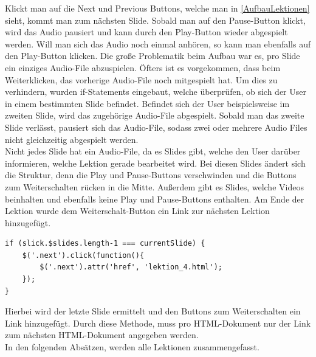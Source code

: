 Klickt man auf die Next und Previous Buttons, welche man in \ref{AufbauLektionen} sieht, kommt man zum nächsten Slide. Sobald man auf den Pause-Button klickt, wird das Audio pausiert und kann durch den Play-Button wieder abgespielt werden. Will man sich das Audio noch einmal anhören, so kann man ebenfalls auf den Play-Button klicken. Die große Problematik beim Aufbau war es, pro Slide ein einziges Audio-File abzuspielen. Öfters ist es vorgekommen, dass beim Weiterklicken, das vorherige Audio-File noch mitgespielt hat. Um dies zu verhindern, wurden if-Statements eingebaut, welche überprüfen, ob sich der User in einem bestimmten Slide befindet. Befindet sich der User beispielsweise im zweiten Slide, wird das zugehörige Audio-File abgespielt. Sobald man das zweite Slide verlässt, pausiert sich das Audio-File, sodass zwei oder mehrere Audio Files nicht gleichzeitig abgespielt werden. \leavevmode \\
Nicht jedes Slide hat ein Audio-File, da es Slides gibt, welche den User darüber informieren, welche Lektion gerade bearbeitet wird. Bei diesen Slides ändert sich die Struktur, denn die Play und Pause-Buttons verschwinden und die Buttons zum Weiterschalten rücken in die Mitte. Außerdem gibt es Slides, welche Videos beinhalten und ebenfalls keine Play und Pause-Buttons enthalten. Am Ende der Lektion wurde dem Weiterschalt-Button ein Link zur nächsten Lektion hinzugefügt.
\lstset{
  frame=leftline,
  xleftmargin=.05\textwidth
}
\begin{lstlisting}
if (slick.$slides.length-1 === currentSlide) {
	$('.next').click(function(){
    	$('.next').attr('href', 'lektion_4.html');
    });
}
\end{lstlisting} \leavevmode \newline
Hierbei wird der letzte Slide ermittelt und den Buttons zum Weiterschalten ein Link hinzugefügt. Durch diese Methode, muss pro HTML-Dokument nur der Link zum nächsten HTML-Dokument angegeben werden. \leavevmode \\
In den folgenden Absätzen, werden alle Lektionen zusammengefasst. 
